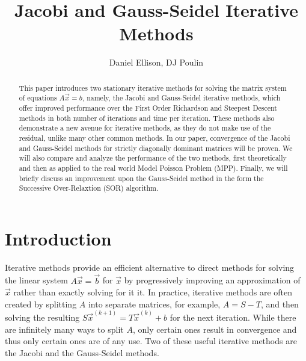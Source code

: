 \documentclass[12pt,letterpaper]{article}
\author{Daniel Ellison, DJ Poulin} %
\title{Jacobi and Gauss-Seidel Iterative Methods}
\theoremstyle{definition}
\begin{document}
	\maketitle 
	
\begin{abstract}
This paper introduces two stationary iterative methods for solving the matrix system of equations $A\vec{x}=b$, namely, the Jacobi and Gauss-Seidel iterative methods, which offer improved performance over the First Order Richardson and Steepest Descent methods in both number of iterations and time per iteration. These methods also demonstrate a new avenue for iterative methods, as they do not make use of the residual, unlike many other common methods. In our paper, convergence of the Jacobi and Gauss-Seidel methods for strictly diagonally dominant matrices will be proven. We will also compare and analyze the performance of the two methods, first theoretically and then as applied to the real world Model Poisson Problem (MPP). Finally, we will briefly discuss an improvement upon the Gauss-Seidel method in the form the Successive Over-Relaxtion (SOR) algorithm.

\end{abstract}

\section*{Introduction}

Iterative methods provide an efficient alternative to direct methods for solving the linear system $A\vec{x}=\vec{b}$ for $\vec{x}$ by progressively improving an approximation of $\vec{x}$ rather than exactly solving for it it. In practice, iterative methods are often created by splitting $A$ into separate matrices, for example, $A = S-T$, and then solving the resulting $S\vec{x}^{(k+1)}=T\vec{x}^{(k)}+b$ for the next iteration. While there are infinitely many ways to split $A$, only certain ones result in convergence and thus only certain ones are of any use. Two of these useful iterative methods are the Jacobi and the Gauss-Seidel methods.
\end{document}
